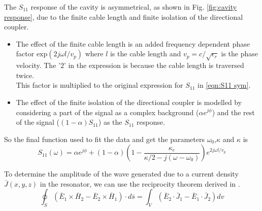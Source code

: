 The $S_{11}$ response of the cavity is asymmetrical, as shown in Fig. \ref{fig:cavity response}, due to the finite cable length and finite isolation of the directional coupler.
\begin{itemize}
\item The effect of the finite cable length is an added frequency dependent phase factor $\text{exp}(2j\omega l/v_p)$ where $l$ is the cable length and $v_p=c/\sqrt{\epsilon_r}$ is the phase velocity. The '$2$' in the expression is because the cable length is traversed twice.\\
This factor is multiplied to the original expression for $S_{11}$ in \ref{eqn:S11 sym}.
\item The effect of the finite isolation of the directional coupler is modelled by considering a part of the signal as a complex background ($\alpha e^{j\phi}$) and the rest of the signal ($(1-\alpha)S_{11}$) as the $S_{11}$ response.
\end{itemize}
So the final function used to fit the data and get the parameters $\omega_0$,$\kappa$ and $\kappa$ is
\begin{equation}
S_{11}(\omega) = \alpha e^{j\phi}+(1-\alpha)\left(1-\frac{\kappa_e}{\kappa/2-j(\omega-\omega_0)}\right)e^{2j\omega l/v_p}
\end{equation}




\iffalse


To determine the amplitude of the wave generated due to a current density $\bar{J}(x,y,z)$ in the resonator, we can use the reciprocity theorem derived in \cite{Pozar2009}.
\begin{equation}
\label{eqn:reciprocity Th}
\oint_S \left( \bar{E}_1 \times\bar{H}_2 - \bar{E}_2 \times\bar{H}_1\right)\cdot d\bar{s}=\int_V \left(\bar{E}_2\cdot\bar{J}_1 - \bar{E}_1\cdot\bar{J}_2\right)dv
\end{equation}

